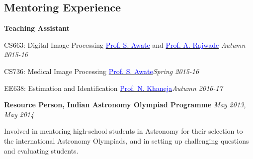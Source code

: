 \documentclass[margin,line]{res}
\newenvironment{list1}{
  \begin{list}{\ding{113}}{%
      \setlength{\itemsep}{0in}
      \setlength{\parsep}{0in} \setlength{\parskip}{0in}
      \setlength{\topsep}{0in} \setlength{\partopsep}{0in} 
      \setlength{\leftmargin}{0.17in}}}{\end{list}}
\begin{document}
\begin{resume}
\section{\sc Mentoring Experience}
\textbf{Teaching Assistant}
\begin{list1}
\item[] CS663: Digital Image Processing \hspace{0.5cm} \href{https://www.cse.iitb.ac.in/~suyash}{\textcolor{blue}{Prof. S. Awate}} and \href{https://www.cse.iitb.ac.in/~ajitvr}{\textcolor{blue}{Prof. A. Rajwade}} \hfill{\textit{Autumn 2015-16}}
\item[] CS736: Medical Image Processing \hspace{2cm} \href{https://www.cse.iitb.ac.in/~suyash}{\textcolor{blue}{Prof. S. Awate}}\hfill{\textit{Spring 2015-16}}
\item[] EE638: Estimation and Identification \hspace{1.25cm} \href{https://www.ee.iitb.ac.in/course/~ee638/Navin}{\textcolor{blue}{Prof. N. Khaneja}}\hfill{\textit{Autumn 2016-17}}
\end{list1}

\vspace*{-0.1in}

\textbf{Resource Person, Indian Astronomy Olympiad Programme} \hfill \textit{May 2013, May 2014} \\
\vspace*{-.15in}
\begin{list1}
\item[] Involved in mentoring high-school students in Astronomy for their selection to the international Astronomy Olympiads, and in setting up challenging questions and evaluating students.
\end{list1}

\vspace*{-0.1in}


\end{resume}
\end{document}
